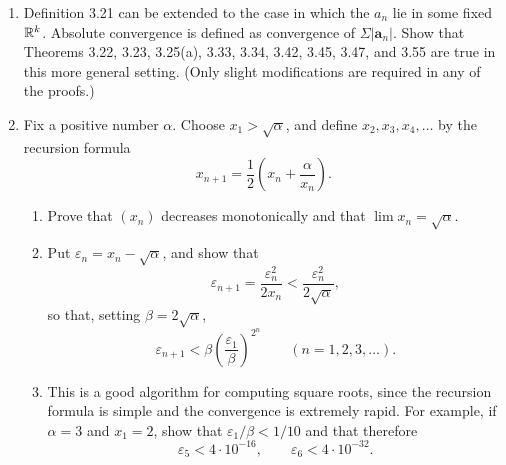 \begin{enumerate}[label=\textbf{3.\arabic*.}, leftmargin=3.0em, itemsep=9pt,
                  topsep=8pt, labelsep=0.5em]
\item Definition 3.21 can be extended to the case in which the $a_n$ lie in
some fixed $\mathbb{R}^k$. Absolute convergence is defined as convergence of
$\Sigma|\mathbf{a}_n|$. Show that Theorems 3.22, 3.23, 3.25(a), 3.33, 3.34,
3.42, 3.45, 3.47, and 3.55 are true in this more general setting. (Only
slight modifications are required in any of the proofs.)

\item Fix a positive number $\alpha$. Choose $x_1 > \sqrt\alpha$, and define
$x_2, x_3, x_4, \dots$ by the recursion formula
\[ x_{n+1} = \frac12\left(x_n + \frac{\alpha}{x_n}\right). \]
\begin{enumerate}[label=(\alph*), leftmargin=2.2em, itemsep=3pt, topsep=3pt]
  \item Prove that $(x_n)$ decreases monotonically and that
        $\lim x_n = \sqrt\alpha$.
  \item Put $\varepsilon_n = x_n - \sqrt\alpha$, and show that
        \[ \varepsilon_{n+1} = \frac{\varepsilon_n^2}{2x_n}
           < \frac{\varepsilon_n^2}{2\sqrt\alpha}, \]
        so that, setting $\beta = 2\sqrt\alpha$,
        \[ \varepsilon_{n+1} < \beta\left(\frac{\varepsilon_1}{\beta}\right)^{2^n}
           \qquad (n = 1,2,3,\dots). \]
  \item This is a good algorithm for computing square roots, since the
        recursion formula is simple and the convergence is extremely rapid.
        For example, if $\alpha = 3$ and $x_1 = 2$, show that
        $\varepsilon_1/\beta < 1/10$ and that therefore
        \[ \varepsilon_5 < 4\cdot10^{-16}, \qquad
           \varepsilon_6 < 4\cdot10^{-32}. \]
\end{enumerate}


\end{enumerate}
